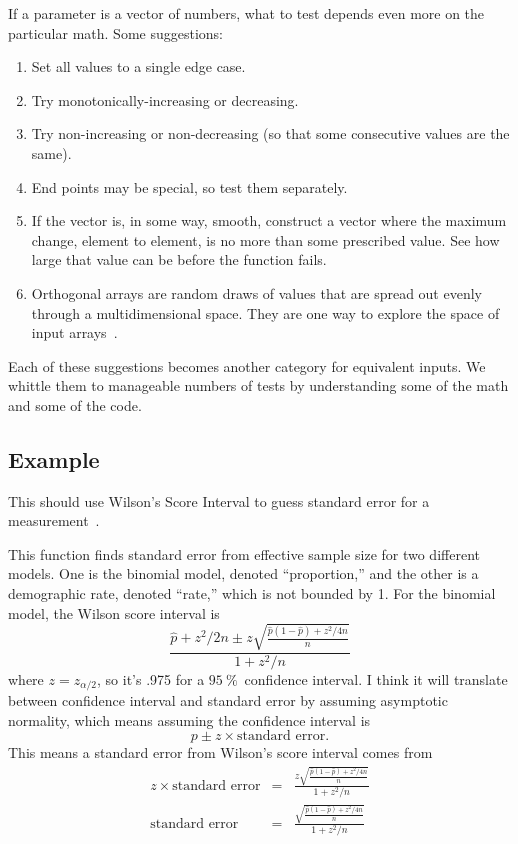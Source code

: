 \documentclass[fleqn,10pt]{olplainarticle}
\begin{document}
If a parameter is a vector of numbers, what to test depends
even more on the particular math. Some suggestions:
\begin{enumerate}
    \item Set all values to a single edge case.
    \item Try monotonically-increasing or decreasing.
    \item Try non-increasing or non-decreasing (so that some
    consecutive values are the same).
    \item End points may be special, so test them separately.
    \item If the vector is, in some way, smooth, construct
    a vector where the maximum change, element to element, is no
    more than some prescribed value. See how large that value can
    be before the function fails.
    \item Orthogonal arrays are random draws of values that
    are spread out evenly through a multidimensional space.
    They are one way to explore the space of input arrays~\citep{Owen1992}.
\end{enumerate}
Each of these suggestions becomes another category for
equivalent inputs. We whittle them to manageable numbers of
tests by understanding some of the math and some of the code.


\subsection{Example}\label{sec:parameter-wilson}
This should use Wilson's Score Interval to guess standard error for a measurement~\citep{agresti1998approximate}.

This function finds standard error from effective sample size for two
different models. One is the binomial model, denoted ``proportion,''
and the other is a demographic rate, denoted ``rate,'' which is not bounded
by 1. For the binomial model, the Wilson score interval is
\begin{equation}
    \frac{\hat{p}+z^2/2n\pm z\sqrt{\frac{\hat{p}(1-\hat{p})+z^2/4n}{n}}}{1+z^2/n}
\end{equation}
where $z=z_{\alpha/2}$, so it's .975 for a $95\:\%$~confidence interval.
I think it will translate between confidence interval and standard
error by assuming asymptotic normality, which means assuming the
confidence interval is
\begin{equation}
    p\pm z \times\mbox{standard error}.
\end{equation}
This means a standard error from Wilson's score interval comes from
\begin{eqnarray}
    z \times\mbox{standard error} & = & \frac{z\sqrt{\frac{\hat{p}(1-\hat{p})+z^2/4n}{n}}}{1+z^2/n} \\
    \mbox{standard error} & = & \frac{\sqrt{\frac{\hat{p}(1-\hat{p})+z^2/4n}{n}}}{1+z^2/n}
\end{eqnarray}
\end{document}
